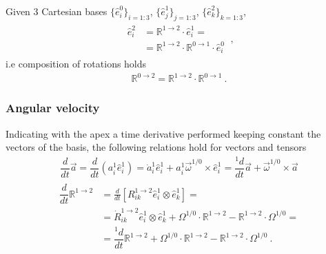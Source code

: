 \documentclass[letterpaper,10pt,english]{jupyterBook}
\begin{document}
\sphinxAtStartPar
Given 3 Cartesian bases \(\{ \hat{e}^0_i \}_{i=1:3}\), \(\{ \hat{e}^1_j \}_{j=1:3}\), \(\{ \hat{e}^2_k \}_{k=1:3}\),
\begin{equation*}
\begin{split}\begin{aligned}
 \hat{e}^2_i 
  & = \mathbb{R}^{1 \rightarrow 2} \cdot \hat{e}^1_i = \\ 
  & = \mathbb{R}^{1 \rightarrow 2} \cdot \mathbb{R}^{0 \rightarrow 1} \cdot\hat{e}^0_i 
\end{aligned} \ , \end{split}
\end{equation*}
\sphinxAtStartPar
i.e composition of rotations holds
\begin{equation*}
\begin{split}\mathbb{R}^{0 \rightarrow 2} = \mathbb{R}^{1 \rightarrow 2} \cdot \mathbb{R}^{0 \rightarrow 1} \ .\end{split}
\end{equation*}\subsubsection*{Angular velocity}

\sphinxAtStartPar
Indicating with the apex a time derivative performed keeping constant the vectors of the basis, the following relations hold for vectors and tensors
\begin{equation*}
\begin{split}\dfrac{d}{dt}{\vec{a}} = \dfrac{d }{d t} \left( a^1_i \hat{e}^1_i  \right) = \dot{a}^1_i \hat{e}^1_i + a^1_i \vec{\omega}^{1/0} \times \hat{e}^1_i = \dfrac{{}^1 d}{d t} \vec{a} + \vec{\omega}^{1/0} \times \vec{a} \end{split}
\end{equation*}\begin{equation*}
\begin{split}\begin{aligned}
\dfrac{d}{dt} \mathbb{R}^{1 \rightarrow 2} 
  & = \frac{d}{dt} \left[ R^{1 \rightarrow 2}_{ik} \hat{e}^1_i \otimes \hat{e}^1_k \right] = \\
  & = \dot{R}^{1\rightarrow 2}_{ik} \hat{e}^1_i \otimes \hat{e}^1_k + \mathbb{\Omega}^{1/0} \cdot  \mathbb{R}^{1 \rightarrow 2} - \mathbb{R}^{1 \rightarrow 2} \cdot \mathbb{\Omega}^{1/0} = \\
  & = \dfrac{{}^1 d}{dt} \mathbb{R}^{1 \rightarrow 2} + \mathbb{\Omega}^{1/0} \cdot  \mathbb{R}^{1 \rightarrow 2} - \mathbb{R}^{1 \rightarrow 2} \cdot \mathbb{\Omega}^{1/0} \ .
\end{aligned}\end{split}
\end{equation*}
\sphinxAtStartPar
{} 
\end{document}
